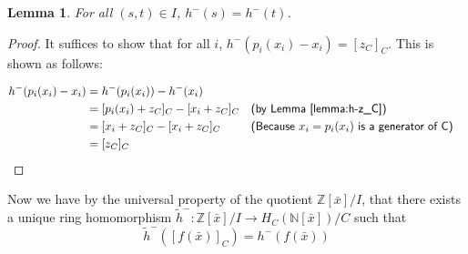 \documentclass{msthesis}
\newtheorem{lemma}[theorem]{Lemma}
\theoremstyle{definition}
\newcommand{\ints}{\mathbb{Z}}
\newcommand{\nat}{\mathbb{N}}
\begin{document}
\begin{lemma}
    For all $(s, t) \in I$, $h^-(s) = h^-(t)$.
\end{lemma}
\begin{proof}
    It suffices to show that for all $i$, $h^-(p_i(x_i) - x_i) = [z_C]_C$.  This is shown as follows:

    \begin{align*}
        h^-(p_i(x_i) - x_i) &= h^-(p_i(x_i)) - h^-(x_i) \\
        &= [p_i(x_i) + z_C]_C - [x_i + z_C]_C && \textsf{(by Lemma \ref{lemma:h-z_C})} \\
        &= [x_i + z_C]_C - [x_i + z_C]_C && \textsf{(Because $x_i=p_i(x_i)$ is a generator of C)} \\
        &= [z_C]_C
    \end{align*}
\end{proof}

Now we have by the universal property of the quotient $\ints[\bar{x}]/I$, that there exists a unique ring homomorphism $\tilde{h}^- : \ints[\bar{x}]/I \to H_C(\nat[\bar{x}])/C$ such that
\[\tilde{h}^-([f(\bar{x})]_C) = h^-(f(\bar{x}))\]
\end{document}
